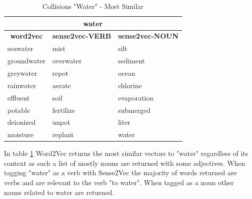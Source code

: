 \begin{table}[h]
\centering
\begin{tabular}{|l|l|l|}
\hline
\multicolumn{3}{|c|}{\textbf{water}}                                                                                                  \\ \hline
\multicolumn{1}{|c|}{\textbf{word2vec}} & \multicolumn{1}{c|}{\textbf{sense2vec-VERB}} & \multicolumn{1}{c|}{\textbf{sense2vec-NOUN}} \\ \hline
seawater                                & mist                                         & silt                                         \\ \hline
groundwater                             & overwater                                    & sediment                                     \\ \hline
greywater                               & repot                                        & ocean                                        \\ \hline
rainwater                               & aerate                                       & chlorine                                     \\ \hline
effluent                                & soil                                         & evaporation                                  \\ \hline
potable                                 & fertilize                                    & submerged                                    \\ \hline
deionized                               & unpot                                        & liter                                        \\ \hline
moisture                                & replant                                      & water                                        \\ \hline
\end{tabular}
\caption{Collisions "Water" - Most Similar}
\label{Collisions "Water" - Most Similar}
\end{table}

\noindent
In table \ref{Collisions "Water" - Most Similar} Word2Vec returns the most similar vectors to "water" regardless of its context as such a list of mostly nouns are returned with some adjectives. When tagging "water" as a verb with Sense2Vec the majority of words returned are verbs and are relevant to the verb "to water". When tagged as a noun other nouns related to water are returned. 

